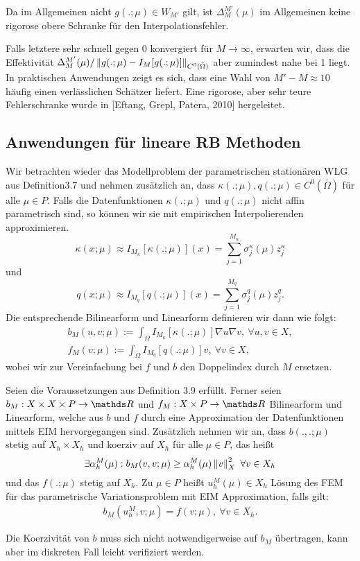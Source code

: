 Da im Allgemeinen nicht $g(.;\mu)\in W_{M'}$ gilt, ist $\Delta_M^{M'}(\mu)$ im Allgemeinen keine rigorose obere Schranke für den Interpolationsfehler.

Falls letztere sehr schnell gegen 0 konvergiert für $M\to \infty$, erwarten wir, dass die Effektivität $\Delta_M^{M'}(\mu)/\left\Vert g(.;\mu) - I_M[g(.;\mu)]\right\Vert_{C^0(\bar{\Omega})}$ aber zumindest nahe bei 1 liegt.
In praktischen Anwendungen zeigt es sich, dass eine Wahl von $M'-M\approx 10$ häufig einen verlässlichen Schätzer liefert.
Eine rigorose, aber sehr teure Fehlerschranke wurde in [Eftang, Grepl, Patera, 2010] hergeleitet.

\subsection{Anwendungen für lineare RB Methoden}
Wir betrachten wieder das Modellproblem der parametrischen stationären WLG aus Definition3.7 und nehmen zusätzlich an, dass $\kappa(.;\mu),q(.;\mu)\in C^0(\bar{\Omega})$ für alle $\mu\in P$.
Falls die Datenfunktionen $\kappa(.;\mu)$ und $q(.;\mu)$ nicht affin parametrisch sind, so können wir sie mit empirischen Interpolierenden approximieren.
\[
\kappa(x;\mu) \approx I_{M_\kappa}[\kappa(.;\mu)](x) = \sum_{j=1}^{M_\kappa} \sigma_j^\kappa(\mu) z_j^\kappa
\]
und
\[
q(x;\mu) \approx I_{M_q}[q(.;\mu)](x) = \sum_{j=1}^{M_q} \sigma_j^q(\mu) z_j^q.
\]
Die entsprechende Bilinearform und Linearform definieren wir dann wie folgt:
\begin{align}
b_M(u,v;\mu) := \int_{\Omega} I_{M_\kappa}[\kappa(.;\mu)] \nabla u \nabla v, ~\forall u,v\in X,\\
f_M(v;\mu) := \int_{\Omega} I_{M_q}[q(.;\mu)] v, ~\forall v\in X,
\end{align}
wobei wir zur Vereinfachung bei $f$ und $b$ den Doppelindex durch $M$ ersetzen.

Seien die Voraussetzungen aus Definition 3.9 erfüllt.
Ferner seien $b_M:X\times X\times P\to \R$ und $f_M:X\times P\to \R$ Bilinearform und Linearform, welche aus $b$ und $f$ durch eine Approximation der Datenfunktionen mittels EIM hervorgegangen sind.
Zusätzlich nehmen wir an, dass $b(.,.;\mu)$ stetig auf $X_h\times X_h$ und koerziv auf $X_h$ für alle $\mu\in P$, das heißt
\[
\exists \alpha_h^M(\mu): b_M(v,v;\mu) \ge \alpha_h^M(\mu) \left\Vert v\right\Vert_X^2 ~\forall v\in X_h
\]
und das $f(.;\mu)$ stetig auf $X_h$.
Zu $\mu\in P$ heißt $u_h^M(\mu)\in X_h$ Lösung des FEM für das parametrische Variationsproblem mit EIM Approximation, falls gilt:
\begin{align}
b_M(u_h^M,v;\mu) = f(v;\mu),~\forall v\in X_h.
\end{align}

Die Koerzivität von $b$ muss sich nicht notwendigerweise auf $b_M$ übertragen, kann aber im diskreten Fall leicht verifiziert werden.
















\cleardoubleoddemptypage

 